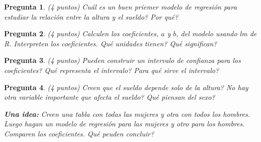 \documentclass{article}
\newtheorem{pregunta}{Pregunta}
\begin{document}
\begin{pregunta} (4 puntos)
Cuál es un buen priemer modelo de regresión para estudiar la relación entre la altura y el sueldo? Por qué?
\end{pregunta}

\begin{pregunta} (4 puntos)
Calculen los coeficientes, $a$ y $b$, del modelo usando lm de R. Interpreten los coeficientes. Qué unidades tienen? Qué significan?
\end{pregunta}

\begin{pregunta} (4 puntos)
 Pueden construir un intervalo de confianza para los coeficientes? Qué representa el intervalo? Para qué sirve el intervalo?
\end{pregunta}

\begin{pregunta} (4 puntos)
 Creen que el sueldo depende solo de la altura? No hay otra variable importante que afecta el sueldo? Qué piensan del sexo?
 \par
 \textbf{Una idea:} Creen una tabla con todas las mujeres y otra con todos los hombres. Luego hagan un modelo de regresión para las mujeres y otro para los hombres. Comparen los coeficientes. Qué peuden concluir?
\end{pregunta}
\end{document}
